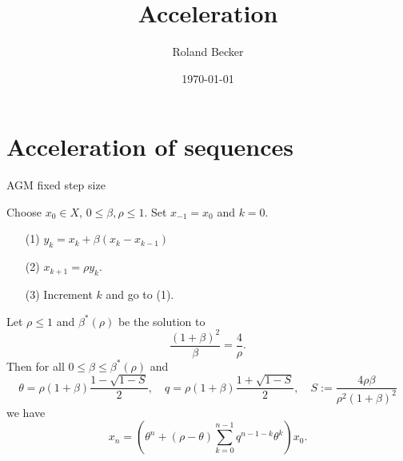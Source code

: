 \documentclass[english,12pt,a4paper]{article}
\title{Acceleration}
\author{Roland Becker}
\date{\today}
\begin{document}
\maketitle
\setcounter{tocdepth}{2}
\tableofcontents
%
%
\section{Acceleration of sequences}\label{sec:}
%
%
\begin{yellow}
\begin{algorithm}[H]
\caption{AGM fixed step size} 
\label{algorithm:AGMfixed} 
%
Choose $x_0\in X$, $0\le \beta,\rho \le 1$. Set $x_{-1}=x_0$ and $k=0$.
%
\begin{itemize}
\item[(1)] $y_{k} = x_{k} + \beta(x_{k}-x_{k-1})$
\item[(2)] $x_{k+1} = \rho y_k$.
\item[(3)] Increment $k$ and go to (1).
\end{itemize}
%
\end{algorithm}
\end{yellow}
%
\begin{lemma}\label{lemma:}
%
Let $\rho\le 1$ and $\beta^*(\rho)$ be the solution to
%
\begin{equation}\label{eq:ac_z_geom_cond1}
\frac{(1+\beta)^2}{\beta} = \frac{4}{\rho}.
\end{equation}
%
Then for all $0\le \beta\le \beta^*(\rho)$ and
%
\begin{equation}\label{eq:ac_z_q_theta}
\theta = \rho(1+\beta) \frac{1- \sqrt{1-S}}{2},\quad
q = \rho(1+\beta) \frac{1+ \sqrt{1-S}}{2}, \quad  S := \frac{4 \rho\beta}{\rho^2(1+\beta)^2}
\end{equation}
%
we have
%
\begin{equation}\label{eq:ac_formula}
x_{n} = \left( \theta^n + (\rho-\theta)\sum_{k=0}^{n-1} q^{n-1-k}\theta^k\right)x_0.
\end{equation}
%
\end{lemma}
%
\end{document}
